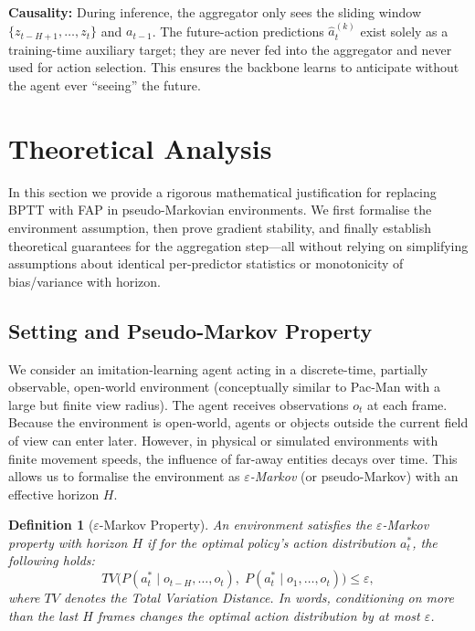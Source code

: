 \documentclass[11pt]{article}
\newtheorem{definition}{Definition}
\begin{document}
\textbf{Causality:} During inference, the aggregator only sees the sliding window \(\{z_{t-H+1},\dots,z_t\}\) and \(a_{t-1}\). The future-action predictions \(\hat{a}_t^{(k)}\) exist solely as a training-time auxiliary target; they are never fed into the aggregator and never used for action selection. This ensures the backbone learns to anticipate without the agent ever ``seeing'' the future.

\section{Theoretical Analysis}

In this section we provide a rigorous mathematical justification for replacing BPTT with FAP in pseudo-Markovian environments. We first formalise the environment assumption, then prove gradient stability, and finally establish theoretical guarantees for the aggregation step—all without relying on simplifying assumptions about identical per-predictor statistics or monotonicity of bias/variance with horizon.

\subsection{Setting and Pseudo-Markov Property}

We consider an imitation-learning agent acting in a discrete-time, partially observable, open-world environment (conceptually similar to Pac-Man with a large but finite view radius). The agent receives observations \(o_t\) at each frame. Because the environment is open-world, agents or objects outside the current field of view can enter later. However, in physical or simulated environments with finite movement speeds, the influence of far-away entities decays over time. This allows us to formalise the environment as \emph{\(\varepsilon\)-Markov} (or pseudo-Markov) with an effective horizon \(H\).

\begin{definition}[\(\varepsilon\)-Markov Property]
An environment satisfies the \(\varepsilon\)-Markov property with horizon \(H\) if for the optimal policy's action distribution \(a_t^*\), the following holds:
\[
TV\bigl( P(a_t^* \mid o_{t-H}, \dots, o_t),\; P(a_t^* \mid o_1, \dots, o_t) \bigr) \le \varepsilon,
\]
where \(TV\) denotes the Total Variation Distance. In words, conditioning on more than the last \(H\) frames changes the optimal action distribution by at most \(\varepsilon\).
\end{definition}
\end{document}
